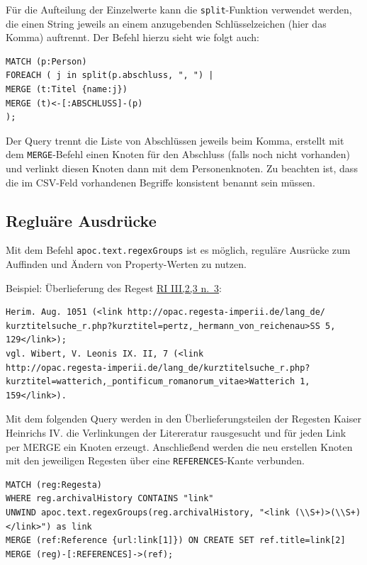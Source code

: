 Für die Aufteilung der Einzelwerte kann die \texttt{split}-Funktion
verwendet werden, die einen String jeweils an einem anzugebenden
Schlüsselzeichen (hier das Komma) auftrennt. Der Befehl hierzu sieht wie
folgt auch:

\begin{verbatim}
MATCH (p:Person)
FOREACH ( j in split(p.abschluss, ", ") |
MERGE (t:Titel {name:j})
MERGE (t)<-[:ABSCHLUSS]-(p)
);
\end{verbatim}

Der Query trennt die Liste von Abschlüssen jeweils beim Komma, erstellt
mit dem \texttt{MERGE}-Befehl einen Knoten für den Abschluss (falls noch
nicht vorhanden) und verlinkt diesen Knoten dann mit dem Personenknoten.
Zu beachten ist, dass die im CSV-Feld vorhandenen Begriffe konsistent
benannt sein müssen.

\hypertarget{regluuxe4re-ausdruxfccke}{%
\subsection{Regluäre Ausdrücke}\label{regluuxe4re-ausdruxfccke}}

Mit dem Befehl \texttt{apoc.text.regexGroups} ist es möglich, reguläre
Ausrücke zum Auffinden und Ändern von Property-Werten zu nutzen.

Beispiel: Überlieferung des Regest
\href{http://www.regesta-imperii.de/id/1051-02-02_1_0_3_2_3_3_3}{RI
III,2,3 n.~3}:

\begin{verbatim}
Herim. Aug. 1051 (<link http://opac.regesta-imperii.de/lang_de/
kurztitelsuche_r.php?kurztitel=pertz,_hermann_von_reichenau>SS 5, 129</link>);
vgl. Wibert, V. Leonis IX. II, 7 (<link
http://opac.regesta-imperii.de/lang_de/kurztitelsuche_r.php?
kurztitel=watterich,_pontificum_romanorum_vitae>Watterich 1, 159</link>).
\end{verbatim}

Mit dem folgenden Query werden in den Überlieferungsteilen der Regesten
Kaiser Heinrichs IV. die Verlinkungen der Litereratur rausgesucht und
für jeden Link per MERGE ein Knoten erzeugt. Anschließend werden die neu
erstellen Knoten mit den jeweiligen Regesten über eine
\texttt{REFERENCES}-Kante verbunden.

\begin{verbatim}
MATCH (reg:Regesta)
WHERE reg.archivalHistory CONTAINS "link"
UNWIND apoc.text.regexGroups(reg.archivalHistory, "<link (\\S+)>(\\S+)</link>") as link
MERGE (ref:Reference {url:link[1]}) ON CREATE SET ref.title=link[2]
MERGE (reg)-[:REFERENCES]->(ref);
\end{verbatim}

